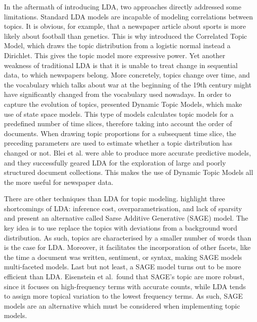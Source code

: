 In the aftermath of introducing LDA, two approaches directly addressed some limitations. Standard LDA models are incapable of modeling correlations between topics. It is obvious, for example, that a newspaper article about sports is more likely about football than genetics. This is why \citet{Blei:2005:CTM:2976248.2976267} introduced the Correlated Topic Model, which draws the topic distribution from a logistic normal instead a Dirichlet. This gives the topic model more expressive power. Yet another weakness of traditional LDA is that it is unable to treat change in sequential data, to which newspapers belong. More concretely, topics change over time, and the vocabulary which talks about war at the beginning of the 19th century might have significantly changed from the vocabulary used nowadays. In order to capture the evolution of topics, \citet{bleidynamic2006} presented Dynamic Topic Models, which make use of state space models. This type of models calculates topic models for a predefined number of time slices, therefore taking into account the order of documents. When drawing topic proportions for a subsequent time slice, the preceding parameters are used to estimate whether a topic distribution has changed or not. Blei et al. were able to produce more accurate predictive models, and they successfully geared LDA for the exploration of large and poorly structured document collections. This makes the use of Dynamic Topic Models all the more useful for newspaper data. 

There are other techniques than LDA for topic modeling. \citet{EisensteinAX11} highlight three shortcomings of LDA: inference cost, overparametrisation, and lack of sparsity and present an alternative called Sarse Additive Generative (SAGE) model. The key idea is to use  replace the topics with deviations from a background word distribution. As such, topics are characterised by a smaller number of words than is the case for LDA. Moreover, it facilitates the incorporation of other facets, like the time a document was written, sentiment, or syntax, making SAGE models multi-faceted models. Last but not least, a SAGE model turns out to be more efficient than LDA. Eisenstein et al.~found that SAGE's topic are more robust, since it focuses on high-frequency terms with accurate counts, while LDA tends to assign more topical variation to the lowest frequency terms. As such, SAGE models are an alternative which must be considered when implementing topic models.

